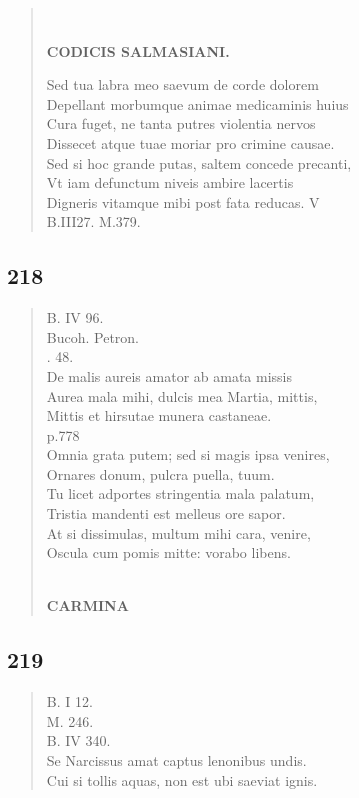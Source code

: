 \documentclass[11pt, a4paper]{report}
\begin{document}
\begin{verse}
        ﻿\pagebreak 
    \begin{center} \textbf{CODICIS SALMASIANI.} \end{center} \marginpar{[185]} Sed tua labra meo saevum de corde dolorem \\ Depellant morbumque animae medicaminis huius \\ Cura fuget, ne tanta putres violentia nervos \\ Dissecet atque tuae moriar pro crimine causae. \\ Sed si hoc grande putas, saltem concede precanti, \\ Vt iam defunctum niveis ambire lacertis \\ Digneris vitamque mibi post fata reducas. V \\ B.III27. M.379. \\ 
      \end{verse}
  
            \subsection*{218}
      \begin{verse}
      B. IV 96. \\ Bucoh. Petron. \\ . 48. \\ De malis aureis amator ab amata missis \\ Aurea mala mihi, dulcis mea Martia, mittis, \\ Mittis et hirsutae munera castaneae. \\ p.778 \\ Omnia grata putem; sed si magis ipsa venires, \\ Ornares donum, pulcra puella, tuum. \\ Tu licet adportes stringentia mala palatum, \\ Tristia mandenti est melleus ore sapor. \\ At si dissimulas, multum mihi cara, venire, \\ Oscula cum pomis mitte: vorabo libens. \\ 
        ﻿\pagebreak 
     \marginpar{[186]} \begin{center} \textbf{CARMINA} \end{center}
      \end{verse}
  
            \subsection*{219}
      \begin{verse}
      B. I 12. \\ M. 246. \\ B. IV 340. \\ Se Narcissus amat captus lenonibus undis. \\ Cui si tollis aquas, non est ubi saeviat ignis. \\ 
      \end{verse}
  
\end{document}
